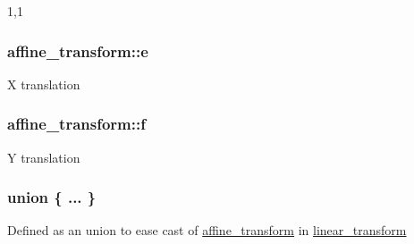 1,1 \hypertarget{structaffine__transform_9e5214673c53d4a7f5f9ac3083b00c69}{
\subsubsection{ {\bf affine\_\-transform::e}}}
\label{structaffine__transform_9e5214673c53d4a7f5f9ac3083b00c69}


X translation \hypertarget{structaffine__transform_4aa4aae576af9e45000031729455ffd2}{
\subsubsection{ {\bf affine\_\-transform::f}}}
\label{structaffine__transform_4aa4aae576af9e45000031729455ffd2}


Y translation \hypertarget{structaffine__transform_36cc5a394147e6e77a96c4b5f8d7b01f}{
\subsubsection{\setlength{\rightskip}{0pt plus 5cm}union \{ ... \} }}
\label{structaffine__transform_36cc5a394147e6e77a96c4b5f8d7b01f}


Defined as an union to ease cast of \hyperlink{structaffine__transform}{affine\_\-transform} in \hyperlink{structlinear__transform}{linear\_\-transform} 